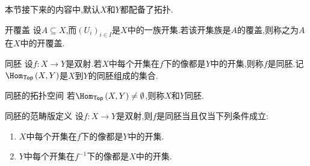 本节接下来的内容中,默认$X$和$Y$都配备了拓扑.

\begin{definition}{开覆盖}{}
	设$A\subseteq X$,而$\left(U_{i}\right)_{i\in I}$是$X$中的一族开集.若该开集族是$A$的覆盖,则称之为$A$在$X$中的开覆盖.
\end{definition}

\begin{definition}{同胚}{}
	设$f:X\to Y$是双射.若$X$中每个开集在$f$下的像都是$Y$中的开集,则称$f$是同胚.记$\Hom_{\mathsf{Top}}\left(X,Y\right)$是$X$到$Y$的同胚组成的集合.
\end{definition}

\begin{definition}{同胚的拓扑空间}{}
	若$\Hom_{\mathsf{Top}}\left(X,Y\right)\neq\emptyset$,则称$X$和$Y$同胚.
\end{definition}

\begin{theorem}{同胚的范畴版定义}{}
	设$f:X\to Y$是双射,则$f$是同胚当且仅当下列条件成立:
	\begin{enumerate}
		\item $X$中每个开集在$f$下的像都是$Y$中的开集.
		\item $Y$中每个开集在$f^{-1}$下的像都是$X$中的开集.
	\end{enumerate}
\end{theorem}


























